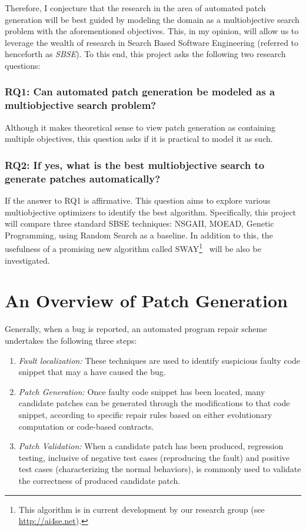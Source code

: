 \documentclass[9pt, compsoc, journal]{IEEEtran}
\begin{document}
Therefore, I conjecture that the research in the area of automated patch generation will be best guided by modeling the domain as a multiobjective search problem with the aforementioned objectives. This, in my opinion, will allow us to leverage the wealth of research in Search Based Software Engineering (referred to henceforth as \textit{SBSE}). To this end, this project asks the following two research questions:

\subsubsection*{RQ1: Can automated patch generation be modeled as a multiobjective search problem?}
Although it makes theoretical sense to view patch generation as containing multiple objectives, this question asks if it is practical to model it as such.

\subsubsection*{RQ2: If yes, what is the best multiobjective search to generate patches automatically?}
\label{rq2}
If the answer to RQ1 is affirmative. This question aims to explore various multiobjective optimizers to identify the best algorithm. Specifically, this project will compare three standard SBSE techniques: NSGAII, MOEAD, Genetic Programming, using Random Search as a baseline. In addition to this, the usefulness of a promising new algorithm called SWAY\footnote{This algorithm is in current development by our research group (see \href{http://ai4se.net}{{http://ai4se.net}}).}~\cite{chen2016sampling, nair2016accidental} will be also be investigated. 

\section{An Overview of Patch Generation}

Generally, when a bug is reported, an automated program repair scheme undertakes the following three steps:

\begin{enumerate}
    \item \textit{Fault localization:}
    These techniques are used to identify suspicious faulty code snippet that may a have caused the bug.
    
    \item \textit{Patch Generation:}
    Once faulty code snippet has been located, many candidate patches can be generated through the modifications to that code snippet, according to specific repair rules based on either evolutionary computation or code-based contracts. 
    
    \item \textit{Patch Validation:}
    When a candidate patch has been produced, regression testing, inclusive of negative test cases (reproducing the fault) and positive test cases (characterizing the normal behaviors), is commonly used to validate the correctness of produced candidate patch.

\end{enumerate}
\end{document}
